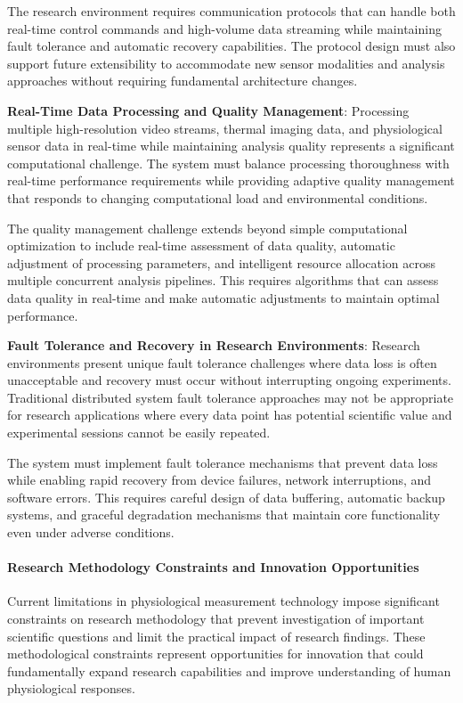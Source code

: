 \documentclass[11pt,a4paper]{article}
\begin{document}
The research environment requires communication protocols that can handle both
real-time control commands and
high-volume data streaming while maintaining fault tolerance and automatic recovery
capabilities.  The protocol design
must also support future extensibility to accommodate new sensor modalities and
analysis approaches without requiring
fundamental architecture changes.

\textbf{Real-Time Data Processing and Quality Management}: Processing multiple high-resolution video streams, thermal imaging
data, and physiological sensor data in real-time while maintaining analysis quality
represents a significant
computational challenge.  The system must balance processing thoroughness with
real-time performance requirements while
providing adaptive quality management that responds to changing computational load
and environmental conditions.

The quality management challenge extends beyond simple computational optimization to
include real-time assessment of
data quality, automatic adjustment of processing parameters, and intelligent resource
allocation across multiple
concurrent analysis pipelines.  This requires algorithms that can
assess data quality in real-time and make
automatic adjustments to maintain optimal performance.

\textbf{Fault Tolerance and Recovery in Research Environments}: Research environments present unique fault tolerance
challenges where data loss is often unacceptable and recovery must occur without
interrupting ongoing experiments.
Traditional distributed system fault tolerance approaches may not be appropriate for
research applications where every
data point has potential scientific value and experimental sessions cannot be easily
repeated.

The system must implement fault tolerance mechanisms that prevent data
loss while enabling rapid recovery
from device failures, network interruptions, and software errors.  This requires
careful design of data buffering,
automatic backup systems, and graceful degradation mechanisms that maintain core
functionality even under adverse
conditions.

\paragraph{Research Methodology Constraints and Innovation Opportunities}

Current limitations in physiological measurement technology impose significant
constraints on research methodology that
prevent investigation of important scientific questions and limit the practical
impact of research findings.  These
methodological constraints represent opportunities for innovation that could
fundamentally expand research capabilities
and improve understanding of human physiological responses.
\end{document}

